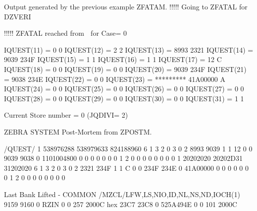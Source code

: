\begin{Listing}{Output generated by the previous example}
ZFATAM.  !!!!!  Going to ZFATAL for DZVERI

!!!!! ZFATAL reached from   for Case=  0

         IQUEST(11) =         0                0
         IQUEST(12) =         2                2
         IQUEST(13) =      8993             2321
         IQUEST(14) =      9039             234F
         IQUEST(15) =         1                1
         IQUEST(16) =         1                1
         IQUEST(17) =        12                C
         IQUEST(18) =         0                0
         IQUEST(19) =         0                0
         IQUEST(20) =      9039             234F
         IQUEST(21) =      9038             234E
         IQUEST(22) =         0                0
         IQUEST(23) = *********         41A00000   A 
         IQUEST(24) =         0                0
         IQUEST(25) =         0                0
         IQUEST(26) =         0                0
         IQUEST(27) =         0                0
         IQUEST(28) =         0                0
         IQUEST(29) =         0                0
         IQUEST(30) =         0                0
         IQUEST(31) =         1                1

         Current Store number =  0  (JQDIVI= 2)

ZEBRA SYSTEM Post-Mortem from ZPOSTM.

/QUEST/
             1    538976288    538979633    824188960            6            1            3            2
             0            3            0            2         8993         9039            1            1
            12            0            0         9039         9038            0   1101004800            0
             0            0            0            0            0            0            1            2
             0            0            0            0            0            0            0            0
             1     20202020     20202D31     31202020            6            1            3            2
             0            3            0            2         2321         234F            1            1
             C            0            0         234F         234E            0     41A00000            0
             0            0            0            0            0            0            1            2
             0            0            0            0            0            0            0            0

Last Bank Lifted - COMMON /MZCL/LFW,LS,NIO,ID,NL,NS,ND,IOCH(1)
       9159      9160   0  RZIN       0       0     257        2000C hex
          23C7         23C8            0     525A494E            0            0          101        2000C


\end{Listing}
